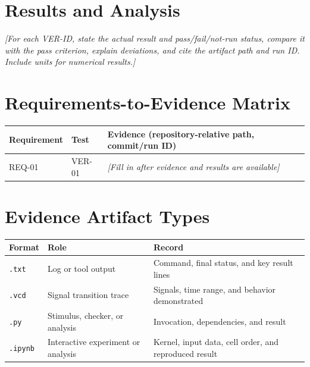 


\section{Results and Analysis}
\textit{[For each VER-ID, state the actual result and pass/fail/not-run status, compare it with the pass criterion, explain deviations, and cite the artifact path and run ID. Include units for numerical results.]}

\section{Requirements-to-Evidence Matrix}
\begin{tabularx}{\textwidth}{@{}p{24mm}p{20mm}X@{}}
  \toprule
  Requirement & Test & Evidence (repository-relative path, commit/run ID) \\
  \midrule
  REQ-01 & VER-01 & \textit{[Fill in after evidence and results are available]} \\
  \bottomrule
\end{tabularx}

\section{Evidence Artifact Types}
\begin{tabularx}{\textwidth}{@{}p{18mm}X X@{}}
  \toprule
  Format & Role & Record \\
  \midrule
  \texttt{.txt} & Log or tool output & Command, final status, and key result lines \\
  \texttt{.vcd} & Signal transition trace & Signals, time range, and behavior demonstrated \\
  \texttt{.py} & Stimulus, checker, or analysis & Invocation, dependencies, and result \\
  \texttt{.ipynb} & Interactive experiment or analysis & Kernel, input data, cell order, and reproduced result \\
  \bottomrule
\end{tabularx}
